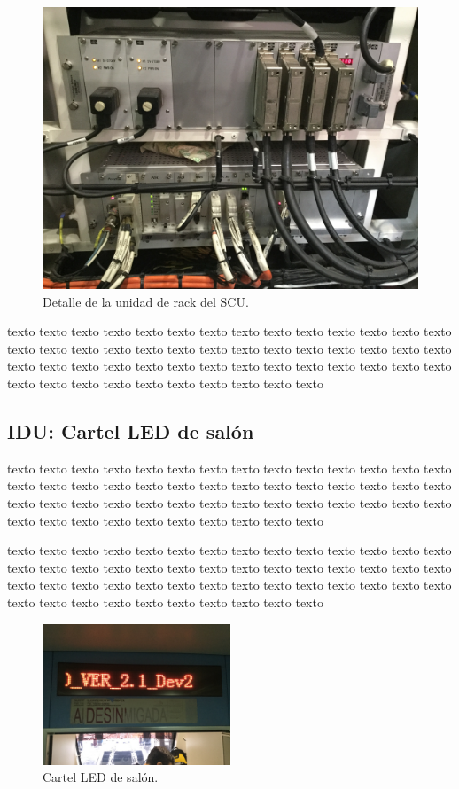 \documentclass[
11pt, %
]{charter}
\begin{document}
\begin{figure}[htpb]
\centering 
\includegraphics[width=1\textwidth]{./Pics/IMG_4591.JPG}
\caption{Detalle de la unidad de rack del SCU.}
\label{fig:rack SCU}
\end{figure}

texto texto texto texto texto texto texto texto texto texto texto texto texto texto texto texto texto texto texto texto texto texto texto texto texto texto texto texto texto texto texto texto texto texto texto texto texto texto texto texto texto texto texto texto texto texto texto texto texto texto texto texto 


\pagebreak
\subsection{IDU: Cartel LED de salón}

texto texto texto texto texto texto texto texto texto texto texto texto texto texto texto texto texto texto texto texto texto texto texto texto texto texto texto texto texto texto texto texto texto texto texto texto texto texto texto texto texto texto texto texto texto texto texto texto texto texto texto texto 


texto texto texto texto texto texto texto texto texto texto texto texto texto texto texto texto texto texto texto texto texto texto texto texto texto texto texto texto texto texto texto texto texto texto texto texto texto texto texto texto texto texto texto texto texto texto texto texto texto texto texto texto 


\begin{figure}[htpb]
\centering 
\includegraphics[width=0.5\textwidth]{./Pics/IMG_4563.JPG}
\caption{Cartel LED de salón.}
\label{fig:cartel de salón}
\end{figure}
\end{document}
